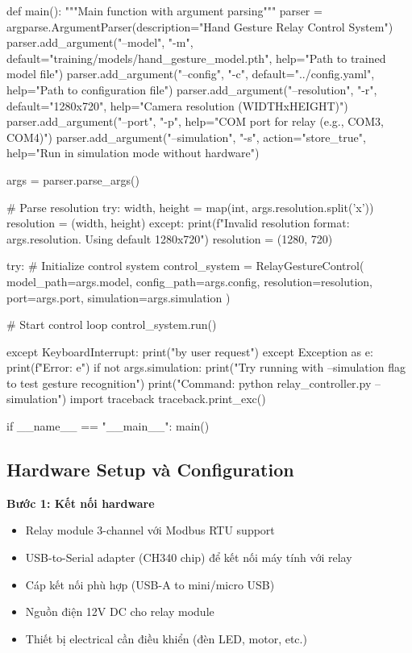 \begin{aivncodebox}
\begin{python}
def main():
    """Main function with argument parsing"""
    parser = argparse.ArgumentParser(description="Hand Gesture Relay Control System")
    parser.add_argument("--model", "-m", 
                       default="training/models/hand_gesture_model.pth",
                       help="Path to trained model file")
    parser.add_argument("--config", "-c", 
                       default="../config.yaml",
                       help="Path to configuration file")
    parser.add_argument("--resolution", "-r", 
                       default="1280x720",
                       help="Camera resolution (WIDTHxHEIGHT)")
    parser.add_argument("--port", "-p", 
                       help="COM port for relay (e.g., COM3, COM4)")
    parser.add_argument("--simulation", "-s", 
                       action="store_true",
                       help="Run in simulation mode without hardware")
    
    args = parser.parse_args()
    
    # Parse resolution
    try:
        width, height = map(int, args.resolution.split('x'))
        resolution = (width, height)
    except:
        print(f"Invalid resolution format: {args.resolution}. Using default 1280x720")
        resolution = (1280, 720)
    
    try:
        # Initialize control system
        control_system = RelayGestureControl(
            model_path=args.model,
            config_path=args.config,
            resolution=resolution,
            port=args.port,
            simulation=args.simulation
        )
        
        # Start control loop
        control_system.run()
        
    except KeyboardInterrupt:
        print("\nExiting by user request")
    except Exception as e:
        print(f"Error: {e}")
        if not args.simulation:
            print("Try running with --simulation flag to test gesture recognition")
            print("Command: python relay_controller.py --simulation")
        import traceback
        traceback.print_exc()

if __name__ == "__main__":
    main()
\end{python}
\end{aivncodebox}

\subsection{Hardware Setup và Configuration}

\textbf{Bước 1: Kết nối hardware}
\begin{itemize}
    \item Relay module 3-channel với Modbus RTU support
    \item USB-to-Serial adapter (CH340 chip) để kết nối máy tính với relay
    \item Cáp kết nối phù hợp (USB-A to mini/micro USB)
    \item Nguồn điện 12V DC cho relay module
    \item Thiết bị electrical cần điều khiển (đèn LED, motor, etc.)
\end{itemize}

